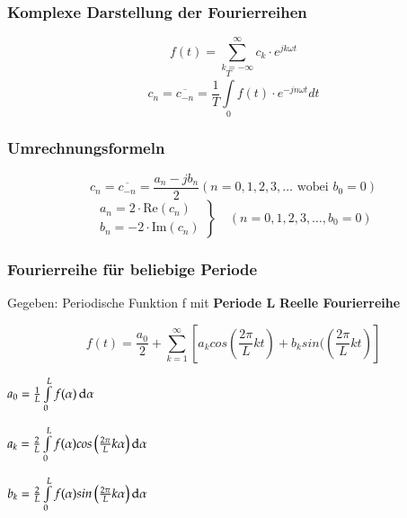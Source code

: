 \begin{minipage}{0.5\linewidth}
\subsubsection{Komplexe Darstellung der Fourierreihen}
$$f(t) = \sum\limits_{k = -\infty}^{\infty} c_k \cdot e^{j k \omega t}$$ 
$$c_n=\overline{c_{-n}}=\frac{1}{T}\int\limits_0^T{f(t)\cdot e^{-jn\omega t}dt}$$
\end{minipage}
\begin{minipage}{0.5\linewidth}
\subsubsection{Umrechnungsformeln}
    $$c_n=\overline{c_{-n}}=\frac{a_n-jb_n}{2} (n=0,1,2,3,\ldots\text{ wobei }b_0=0)$$
    $$
    \left.
    \begin{array}{l} 
    a_n=2 \cdot \text{Re}(c_n)\\
    b_n=-2 \cdot \text{Im}(c_n)
    \end{array}
    \right\} 
    \quad
    (n=0,1,2,3,\ldots, b_0 = 0)$$
\end{minipage}
\subsubsection{Fourierreihe für beliebige Periode}
Gegeben: Periodische Funktion f mit \textbf{Periode L}\newline
\textbf{Reelle Fourierreihe}
\vspace{-0.3cm}
\begin{centering}
    $$ f(t) = \frac{a_0}{2} + \sum_{k=1}^{\infty}\left[a_k cos\left(\frac{2\pi}{L}kt\right)+b_k sin(\left(\frac{2\pi}{L}kt\right) \right] $$
\end{centering}
\vspace{-0.5cm}
\begin{multicols}{3}
{
    $  a_0 = \frac{1}{L} \int\limits_{0}^{L} f(\alpha) \mathop{}\!\mathrm{d} \alpha $
    
    $  a_k =\frac{2}{L} \int\limits_{0}^{L}  f(\alpha) cos\left(\frac{2\pi}{L}k\alpha\right) \mathop{}\!\mathrm{d} \alpha$
    
    $ b_k = \frac{2}{L} \int\limits_{0}^{L} f(\alpha) sin\left(\frac{2\pi}{L}k\alpha\right) \mathop{}\!\mathrm{d} \alpha $
}
\end{multicols}
